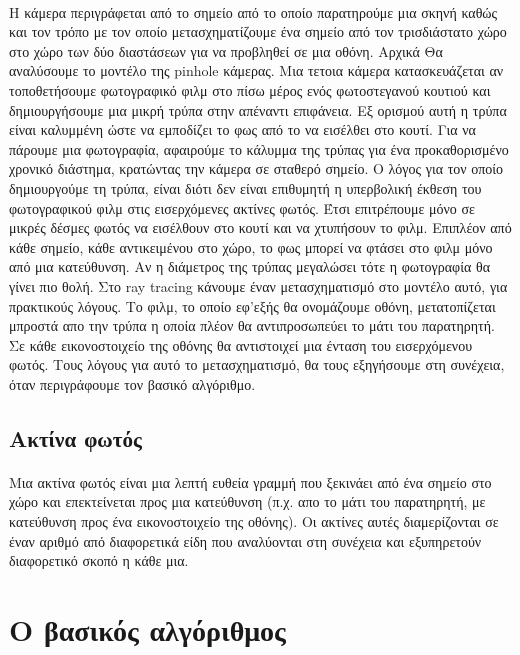\begin{sloppypar}
\paragraph{}
	H κάμερα περιγράφεται από το σημείο από το οποίο παρατηρούμε μια σκηνή καθώς και τον τρόπο με τον οποίο μετασχηματίζουμε
ένα σημείο από τον τρισδιάστατο χώρο στο χώρο των δύο διαστάσεων για να προβληθεί σε μια οθόνη. Αρχικά Θα αναλύσουμε το 
μοντέλο της pinhole κάμερας. Μια τετοια κάμερα κατασκευάζεται αν τοποθετήσουμε φωτογραφικό φιλμ στο πίσω μέρος ενός 
φωτοστεγανού κουτιού  και δημιουργήσουμε μια μικρή τρύπα στην απέναντι επιφάνεια. Εξ ορισμού αυτή η τρύπα είναι καλυμμένη 
ώστε να εμποδίζει το φως από το να εισέλθει στο κουτί. Για να πάρουμε μια φωτογραφία, αφαιρούμε το κάλυμμα της τρύπας 
για ένα προκαθορισμένο χρονικό διάστημα, κρατώντας την κάμερα σε σταθερό σημείο. Ο λόγος για τον οποίο δημιουργούμε 
τη τρύπα, είναι διότι δεν είναι επιθυμητή η υπερβολική έκθεση του φωτογραφικού φιλμ στις εισερχόμενες ακτίνες φωτός. 
Έτσι επιτρέπουμε μόνο σε μικρές δέσμες φωτός να εισέλθουν στο κουτί και να χτυπήσουν το φιλμ. Επιπλέον από κάθε 
σημείο, κάθε αντικειμένου στο χώρο, το φως μπορεί να φτάσει στο φιλμ μόνο από μια κατεύθυνση. Αν η διάμετρος 
της τρύπας μεγαλώσει τότε η φωτογραφία θα γίνει πιο θολή. Στο ray tracing κάνουμε έναν μετασχηματισμό στο μοντέλο
αυτό, για πρακτικούς λόγους. Το φιλμ, το οποίο εφ'εξής θα ονομάζουμε οθόνη, μετατοπίζεται μπροστά απο την τρύπα η 
οποία πλέον θα αντιπροσωπεύει το μάτι του παρατηρητή. Σε κάθε εικονοστοιχείο της οθόνης θα αντιστοιχεί μια ένταση
του εισερχόμενου φωτός. Τους λόγους για αυτό το μετασχηματισμό, θα τους εξηγήσουμε στη συνέχεια, όταν περιγράφουμε
τον βασικό αλγόριθμο.

\subsection{Ακτίνα φωτός}
\paragraph{}
	Μια ακτίνα φωτός είναι μια λεπτή ευθεία γραμμή που ξεκινάει από ένα σημείο στο χώρο και επεκτείνεται προς 
μια κατεύθυνση (π.χ. απο το μάτι του παρατηρητή, με κατεύθυνση προς ένα εικονοστοιχείο της οθόνης). Οι ακτίνες αυτές 
διαμερίζονται σε έναν αριθμό από διαφορετικά είδη που αναλύονται στη συνέχεια και εξυπηρετούν διαφορετικό σκοπό η κάθε μια.

\section{Ο βασικός αλγόριθμος}

\end{sloppypar}
